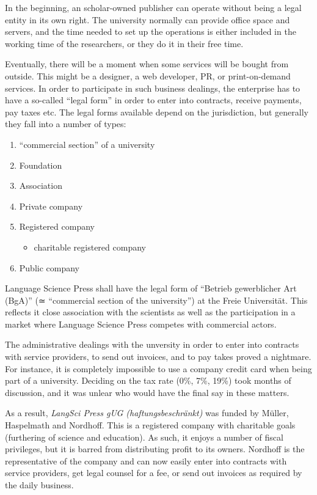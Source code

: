 \documentclass[output=guidelines,nonflat,smallfont,
draftmode
]{langsci/langscibook}
\newcommand{\background}[1]{ 
  \vspace{5mm}
  \renewcommand{\tblslinecolour}{lsDarkBlue}
  \tblssy[red]{explore2}{Background}{\vspace*{-5mm}#1}
}
\newcommand{\langscisolution}[1]{
  \renewcommand{\tblslinecolour}{lsLightBlue}
  \tblssy{langsci}{LangSci solution}{\vspace*{-5mm}#1}
}
\newcommand{\evaluation}[1]{
  \renewcommand{\tblslinecolour}{lsLightOrange}
  \tblssy{receipt}{Evaluation}{\vspace*{-5mm}#1}
}
\renewcommand{\tblssy}[4][black!12]{%
  \renewcommand{\langscisymbol}{#2}\renewcommand{\tblsboxcolor}{#1}
  \begin{mdframed}[style=yellowexercise,frametitle={#3}]
    #4
  \end{mdframed}
}
\begin{document}
\background{In the beginning, an scholar-owned publisher can operate without being a legal entity in its own right. The university normally can provide office space and servers, and the time needed to set up the operations is either included in the working time of the researchers, or they do it in their free time. 

Eventually, there will be a moment when some services will be bought from outside. This might be a designer, a web developer, PR, or print-on-demand services. In order to participate in such business dealings, the enterprise has to have a so-called ``legal form'' in order to enter into contracts, receive payments, pay taxes etc. The legal forms available depend on the jurisdiction, but generally they fall into a number of types:

\begin{enumerate}
 \item ``commercial section'' of a university
 \item Foundation 
 \item Association 
 \item Private company
 \item Registered company 
 \begin{itemize}
  \item charitable registered company
 \end{itemize}
 \item Public company 
\end{enumerate} 
}
\langscisolution{
Language Science Press shall have the legal form of ``Betrieb gewerblicher Art (BgA)'' (≃ ``commercial section of the university'') at the Freie Universität.
This reflects it close association with the scientists as well as the participation in a market where Language Science Press competes with commercial actors. 
}
\evaluation{
The administrative dealings with the unversity in order to enter into contracts with service providers, to send out invoices, and to pay takes proved a nightmare. For instance, it is completely impossible to use a company credit card when being part of a university. Deciding on the tax rate (0\%, 7\%, 19\%) took months of discussion, and it was unlear who would have the final say in these matters. 

As a result, \textit{LangSci Press gUG (haftungsbeschränkt)} was funded by Müller, Haspelmath and Nordhoff. This is a registered company with charitable goals (furthering of science and education). As such, it enjoys a number of fiscal privileges, but it is barred from  distributing profit to its owners. Nordhoff is the representative of the company and can now easily enter into contracts with service providers, get legal counsel for a fee, or send out invoices as required by the daily business. 
}
\end{document}
